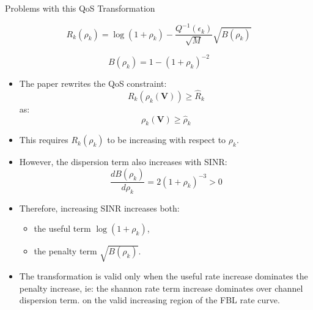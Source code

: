 \documentclass{beamer}
\begin{document}
\begin{frame}{Problems with this QoS Transformation}
\scriptsize

\[
    R_k(\rho_k)
    =
    \log(1+\rho_k)
    -
    \frac{Q^{-1}(\epsilon_k)}{\sqrt{M}}
    \sqrt{B(\rho_k)}
\]

\[
    B(\rho_k)=1-(1+\rho_k)^{-2}
\]

\begin{itemize}
    \item The paper rewrites the QoS constraint:
    \[
        R_k(\rho_k(\mathbf{V}))\ge \widehat{R}_k
    \]
    as:
    \[
        \rho_k(\mathbf{V})\ge \widehat{\rho}_k
    \]

    \item This requires \(R_k(\rho_k)\) to be increasing with respect to \(\rho_k\).

    \item However, the dispersion term also increases with SINR:
    \[
        \frac{dB(\rho_k)}{d\rho_k}
        =
        2(1+\rho_k)^{-3}>0
    \]

    \item Therefore, increasing SINR increases both:
    \begin{itemize}
        \item the useful term \(\log(1+\rho_k)\),
        \item the penalty term \(\sqrt{B(\rho_k)}\).
    \end{itemize}

    \item The transformation is valid only when the useful rate increase dominates the penalty increase, ie: the shannon rate term increase dominates over  channel dispersion term.
    on the valid increasing region of the FBL rate curve.
\end{itemize}

\end{frame}
\end{document}
